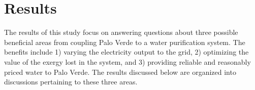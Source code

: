

\section{Results}

The results of this study focus on answering questions about three possible beneficial areas from coupling Palo Verde to a water purification system. The benefits include 1) varying the electricity output to the grid, 2) optimizing the value of the exergy lost in the system, and 3) providing reliable and reasonably priced water to Palo Verde.  The results discussed below are organized into discussions pertaining to these three areas.


